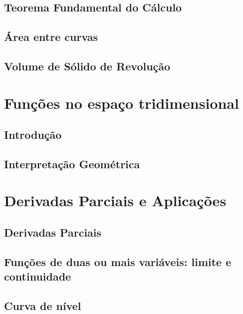 \documentclass[a4paper,12pt,openany]{book}
\theoremstyle{definition}
\begin{document}
\section{Teorema Fundamental do Cálculo}


\section{Área entre curvas}


\section{Volume de Sólido de Revolução}


\chapter{Funções no espaço tridimensional}

\section{Introdução}


\section{Interpretação Geométrica}


\chapter{Derivadas Parciais e Aplicações}

\section{Derivadas Parciais}
\section{Funções de duas ou mais variáveis: limite e continuidade}
\section{Curva de nível}
\end{document}
